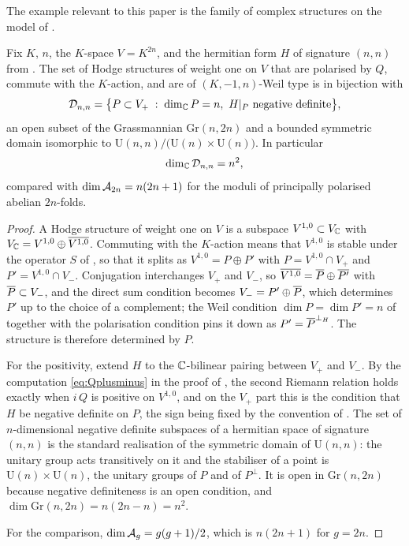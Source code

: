 The example relevant to this paper is the family of complex structures on the
model of .

\begin{proposition}\label{prop:weildomain}
Fix $K$, $n$, the $K$-space $V=K^{2n}$, and the hermitian form $H$ of
signature $(n,n)$ from . The set of Hodge structures of
weight one on $V$ that are polarised by $Q$, commute with the $K$-action, and
are of $(K,-1,n)$-Weil type is in bijection with
\[
  \mathcal{D}_{n,n}
  =\bigl\{P\subset V_{+}\;:\;\dim_{\mathbb{C}}P=n,\ H|_{P}\ \text{negative definite}\bigr\},
\]
an open subset of the Grassmannian $\mathrm{Gr}(n,2n)$ and a bounded symmetric
domain isomorphic to $\mathrm{U}(n,n)/\bigl(\mathrm{U}(n)\times\mathrm{U}(n)\bigr)$.
In particular
\[
  \dim_{\mathbb{C}}\mathcal{D}_{n,n}=n^{2},
\]
compared with $\dim\mathcal{A}_{2n}=n(2n+1)$ for the moduli of principally polarised
abelian $2n$-folds.
\end{proposition}

\begin{proof}
A Hodge structure of weight one on $V$ is a subspace $V^{1,0}\subset V_{\mathbb{C}}$
with $V_{\mathbb{C}}=V^{1,0}\oplus\overline{V^{1,0}}$. Commuting with the $K$-action
means that $V^{1,0}$ is stable under the operator $S$ of ,
so that it splits as $V^{1,0}=P\oplus P'$ with $P=V^{1,0}\cap V_{+}$ and
$P'=V^{1,0}\cap V_{-}$.
Conjugation interchanges $V_{+}$ and $V_{-}$, so
$\overline{V^{1,0}}=\overline{P}\oplus\overline{P'}$ with $\overline{P}\subset V_{-}$, and
the direct sum condition becomes $V_{-}=P'\oplus\overline{P}$, which determines
$P'$ up to the choice of a complement; the Weil condition
$\dim P=\dim P'=n$ of  together with the polarisation
condition pins it down as $P'=\overline{P}^{\perp_{H}}$. The structure is
therefore determined by $P$.

For the positivity, extend $H$ to the $\mathbb{C}$-bilinear pairing between $V_{+}$
and $V_{-}$. By the computation \eqref{eq:Qplusminus} in the proof of
, the second Riemann relation holds exactly when $i\,Q$ is
positive on $V^{1,0}$, and on the $V_{+}$ part this is the condition that $H$
be negative definite on $P$, the sign being fixed by the convention of
. The set of $n$-dimensional negative definite subspaces
of a hermitian space of signature $(n,n)$ is the standard realisation of the
symmetric domain of $\mathrm{U}(n,n)$: the unitary group acts transitively on
it and the stabiliser of a point is $\mathrm{U}(n)\times\mathrm{U}(n)$, the
unitary groups of $P$ and of $P^{\perp}$. It is open in $\mathrm{Gr}(n,2n)$
because negative definiteness is an open condition, and
$\dim\mathrm{Gr}(n,2n)=n(2n-n)=n^{2}$.

For the comparison, $\dim\mathcal{A}_{g}=g(g+1)/2$, which is $n(2n+1)$ for $g=2n$.
\end{proof}


